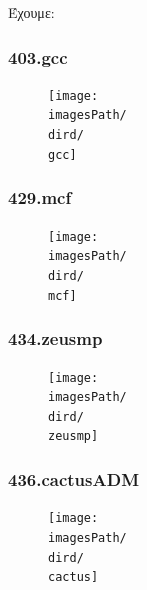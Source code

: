 \documentclass[12pt,a4paper]{article}
\newcommand{\imagesPath}{/home/nick/arch-ntua/ex02/graphs}
\newcommand{\gcc}{403.gcc.cslab_branch_predictors.out.pdf}
\newcommand{\mcf}{429.mcf.cslab_branch_predictors.out.pdf}
\newcommand{\zeusmp}{434.zeusmp.cslab_branch_predictors.out.pdf}
\newcommand{\cactus}{436.cactusADM.cslab_branch_predictors.out.pdf}
\newcommand{\dird}{4.4}
\begin{document}
			Έχουμε:
			
			\subsubsection{403.gcc}
				\begin{figure}[H]
					\begin{center}
						 \texttt{[image: \\imagesPath/\\dird/\\gcc]}
					\end{center}
				\end{figure}
			
			\subsubsection{429.mcf}
				\begin{figure}[H]
					\begin{center}
						 \texttt{[image: \\imagesPath/\\dird/\\mcf]}
					\end{center}
				\end{figure}
			
			\subsubsection{434.zeusmp}
				\begin{figure}[H]
					\begin{center}
						 \texttt{[image: \\imagesPath/\\dird/\\zeusmp]}
					\end{center}
				\end{figure}
			
			\subsubsection{436.cactusADM}
				\begin{figure}[H]
					\begin{center}
						 \texttt{[image: \\imagesPath/\\dird/\\cactus]}
					\end{center}
				\end{figure}
			
\end{document}
